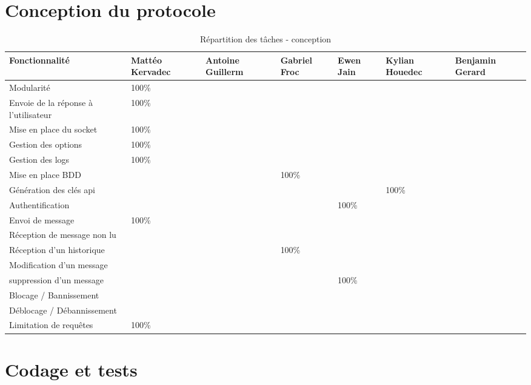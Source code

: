 \documentclass{report}
\begin{document}
\chapter{Conception du protocole}

\begin{table}[ht]
\hspace{-1cm}  %
\begin{tabular}{|p{3cm}|p{2cm}|p{2cm}|p{2cm}|p{2cm}|p{2cm}|p{2cm}|}
\hline
\textbf{Fonctionnalité} & \textbf{Mattéo Kervadec} & \textbf{Antoine Guillerm} & \textbf{Gabriel Froc} & \textbf{Ewen Jain} & \textbf{Kylian Houedec} & \textbf{Benjamin Gerard} \\
\hline
Modularité & 100\% & & & & & \\
\hline
Envoie de la réponse à l'utilisateur & 100\% & & & & & \\
\hline
Mise en place du socket & 100\% & & & & & \\
\hline
Gestion des options & 100\% & & & & & \\
\hline
Gestion des logs & 100\% & & & & & \\
\hline
Mise en place BDD & & & 100\% & & & \\
\hline
Génération des clés api & & & & & 100\% & \\
\hline
Authentification & & & & 100\% & & \\
\hline
Envoi de message & 100\% & & & & & \\
\hline
Réception de message non lu & & & & & & \\
\hline
Réception d'un historique & & & 100\% & & & \\
\hline
Modification d'un message & & & & & & \\
\hline
suppression d'un message & & & & 100\% & & \\
\hline
Blocage / Bannissement & & & & & & \\
\hline
Déblocage / Débannissement &  & & & & & \\
\hline
Limitation de requêtes & 100\% & & & & & \\
\hline
\end{tabular}
\caption{Répartition des tâches - conception}
\end{table}

\chapter{Codage et tests}
\end{document}
